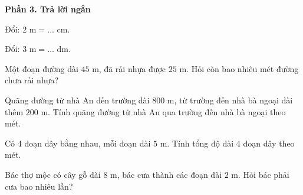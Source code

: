 \textbf{Phần 3. Trả lời ngắn}

\begin{ex} %
Đổi: $2\text{ m} = \dots\text{ cm}$.
\end{ex}

\begin{ex} %
Đổi: $3\text{ m} = \dots\text{ dm}$.
\end{ex}

\begin{ex} %
Một đoạn đường dài $45\text{ m}$, đã rải nhựa được $25\text{ m}$. Hỏi còn bao nhiêu mét đường chưa rải nhựa?
\end{ex}

\begin{ex} %
Quãng đường từ nhà An đến trường dài $800\text{ m}$, từ trường đến nhà bà ngoại dài thêm $200\text{ m}$. Tính quãng đường từ nhà An qua trường đến nhà bà ngoại theo mét.
\end{ex}

\begin{ex} %
Có 4 đoạn dây bằng nhau, mỗi đoạn dài $5\text{ m}$. Tính tổng độ dài 4 đoạn dây theo mét.
\end{ex}

\begin{ex} %
Bác thợ mộc có cây gỗ dài $8\text{ m}$, bác cưa thành các đoạn dài $2\text{ m}$. Hỏi bác phải cưa bao nhiêu lần?
\end{ex}
